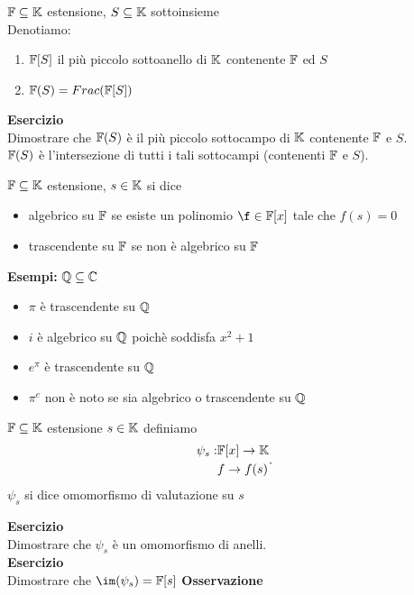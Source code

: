 \documentclass[12px]{article}
\begin{document}
	\begin{nota}
		$\mathbb{F}\subseteq\mathbb{K}$ estensione, $S\subseteq\mathbb{K}$ sottoinsieme\\
		Denotiamo:
		\begin{enumerate}
			\item $\mathbb{F}[S]$ il più piccolo sottoanello di  $\mathbb{K}$ contenente $\mathbb{F}$ ed $S$
			\item  $\mathbb{F}(S) = Frac(\mathbb{F}[S])$
		\end{enumerate}
	\end{nota}
	\textbf{Esercizio}\\
	Dimostrare che $\mathbb{F}(S)$ è il più piccolo sottocampo di $\mathbb{K}$ contenente $\mathbb{F}$ e $S$.\\
	 $\mathbb{F}(S)$ è l'intersezione di tutti i tali sottocampi (contenenti $\mathbb{F}$ e  $S$).\\
	 \begin{defi}
	 	$\mathbb{F}\subseteq\mathbb{K}$ estensione,  $s\in \mathbb{K}$ si dice
		 \begin{itemize}
			 \item algebrico su $\mathbb{F}$ se esiste un polinomio  $\f\in \F[x]$ tale che  $f(s) = 0$
			 \item trascendente su $\mathbb{F}$ se non è algebrico su $\mathbb{F}$
		\end{itemize}
	 \end{defi}
	 \textbf{Esempi:}
	 $\mathbb{Q}\subseteq \mathbb{C}$
	 \begin{itemize}
		 \item $\pi$ è trascendente su $\mathbb{Q}$
		 \item  $i$ è algebrico su $\mathbb{Q} $ poichè soddisfa $x^2 + 1$
		 \item  $e^\pi$ è trascendente su $\mathbb{Q}$
		 \item  $\pi^e$ non è noto se sia algebrico o trascendente su  $\mathbb{Q}$
	 \end{itemize}
	 \begin{defi}
	 	$\mathbb{F}\subseteq \mathbb{K}$ estensione $s\in\mathbb{K}$ definiamo
		\[
			\begin{aligned}
				\psi_s: &\mathbb{F}[x] \rightarrow \mathbb{K}\\
					& f \rightarrow f(s)
			\end{aligned}
		.\] 
		$\psi_s$ si dice omomorfismo di valutazione su $s$
	 \end{defi}
	 \textbf{Esercizio}\\
	 Dimostrare che $\psi_s$ è un omomorfismo di anelli.\\
	 \textbf{Esercizio}\\
	 Dimostrare che $\im(\psi_s) = \F[s]$
	 \textbf{Osservazione}\\
\end{document}
